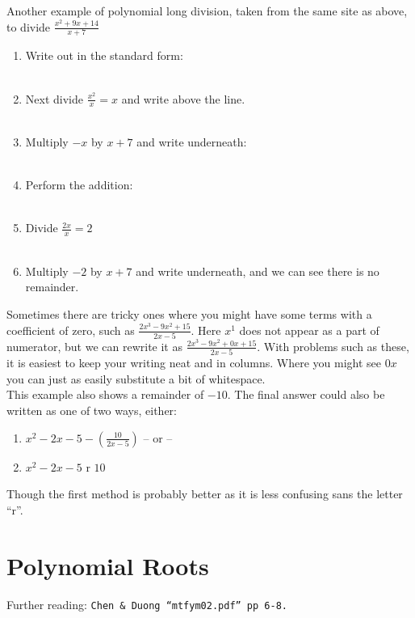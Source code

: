 Another example of polynomial long division, taken from the same site as above,
to divide $\frac{x^2 +9x +14}{x +7}$
\begin{enumerate}
  \item Write out in the standard form:
  \\  \\
  \item Next divide $\frac{x^2}{x}=x$ and write above the line.
  \\  \\
  \item Multiply $-x$ by $x+7$ and write underneath:
  \\  \\
  \item Perform the addition:
  \\  \\
  \item Divide $\frac{2x}{x}=2$
  \\  \\
  \item Multiply $-2$ by $x+7$ and write underneath, and we can see there is no
  remainder.
  \\ 
\end{enumerate}

Sometimes there are tricky ones where you might have some terms with a
coefficient of zero, such as $\frac{2x^3 -9x^2 +15}{2x -5}$. Here $x^1$ does not
appear as a part of numerator, but we can rewrite it as
$\frac{2x^3 -9x^2 +0x +15}{2x -5}$. With problems such as these, it is easiest
to keep your writing neat and in columns. Where you might see $0x$ you can just
as easily substitute a bit of whitespace. \\[0.5cm]
This example also shows a remainder of $-10$. The final answer could also be
written as one of two ways, either:
\begin{enumerate}
  \item $x^2 -2x -5 - \left(\frac{10}{2x -5}\right)$ -- or --
  \item $x^2 -2x -5$ r $10$
\end{enumerate}
Though the first method is probably better as it is less confusing sans the
letter ``r''.

\section{Polynomial Roots}
\label{sec:P Polynomial Root}
Further reading: \texttt{Chen \& Duong ``mtfym02.pdf'' pp 6-8.}

